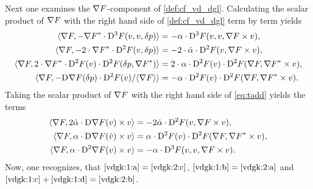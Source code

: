 Next one examines the $ \nabla F $-component of \eqref{def:cf_vd_dgl}.
Calculating the scalar product of $ \nabla F $
with the right hand side of \eqref{def:cf_vd_dgl} term by term yields
\begin{subequations}
    \label{vdgk:1}
    \begin{align}
        \langle  \nabla F ,  - {\nabla F}^* \cdot
        \mathrm{D}^{ 3 }F( v, v, \delta p )  \rangle
        &=
        - \alpha \cdot \mathrm{D}^{ 3 }F( v, v, \nabla F \times v ) ,
        \label{vdgk:1:a}
        \\
        \langle  \nabla F ,  -2 \cdot { \nabla F }^* \cdot \mathrm{D}^{ 2 }F( v, \delta p )  \rangle
        &=
        - 2 \cdot \dot{ \alpha }  \cdot  \mathrm{D}^{ 2 }F( v, \nabla F \times v ) ,
        \label{vdgk:1:b}
        \\
        \langle  \nabla F ,  2 \cdot { \nabla F }^* \cdot \mathrm{D}^{ 2 }F( v ) \cdot
        \mathrm{D}^{ 2 }F( \delta p, {\nabla F}^* )  \rangle
        &=
        2 \cdot \alpha \cdot \mathrm{D}^{ 2 }F( v ) \cdot
        \mathrm{D}^{ 2 }F( \nabla F, {\nabla F}^* \times v ) ,
        \label{vdgk:1:c}
        \\
        \langle  \nabla F ,  -\mathrm{D}^{  }\nabla F( \delta p ) \cdot \mathrm{D}^{ 2 }F( v ) / \langle  \nabla F  \rangle  \rangle
        &=
        - \alpha \cdot \mathrm{D}^{ 2 }F( v ) \cdot
        \mathrm{D}^{ 2 }F( \nabla F, {\nabla F}^* \times v ) .
        \label{vdgk:1:d}
    \end{align}
\end{subequations}
Taking the scalar product of $ \nabla F $
with the right hand side of \eqref{eq:tadd} yields the terms
\begin{subequations}
    \label{vdgk:2}
    \begin{align}
        \langle  \nabla F ,  2 \dot{ \alpha } \cdot \mathrm{D}^{  }\nabla F( v ) \times v  \rangle
        &=
        - 2 \dot{ \alpha } \cdot \mathrm{D}^{ 2 }F( v, \nabla F \times v ) ,
        \label{vdgk:2:a}
        \\
        \langle  \nabla F ,  \alpha \cdot \mathrm{D}^{  } \nabla F ( \dot{ v } ) \times v  \rangle
        &=
        \alpha \cdot \mathrm{D}^{ 2 }F( v ) \cdot
        \mathrm{D}^{ 2 }F( \nabla F, {\nabla F}^* \times v ) ,
        \label{vdgk:2:b}
        \\
        \langle  \nabla F ,  \alpha \cdot \mathrm{D}^{ 2 }\nabla F( v ) \times v  \rangle
        &=
        - \alpha \cdot \mathrm{D}^{ 3 }F( v, v, \nabla F \times v ) .
        \label{vdgk:2:c}
    \end{align}
\end{subequations}
Now, one recognizes, that $ \eqref{vdgk:1:a}  =  \eqref{vdgk:2:c} $,
$ \eqref{vdgk:1:b}  =  \eqref{vdgk:2:a} $ and
$ \eqref{vdgk:1:c} + \eqref{vdgk:1:d}  =  \eqref{vdgk:2:b} $.

